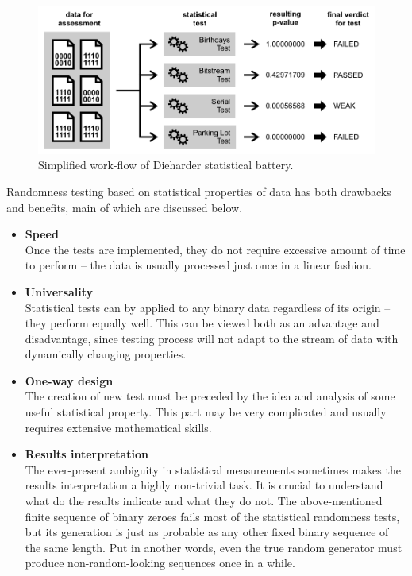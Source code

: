 \documentclass[12pt,twoside]{fithesis2}		%
\renewcommand{\_}{\leavevmode \kern0.0em\vbox{\hrule width0.4em}}
\newcommand{\squarebullet}{\textcolor{black}{\raisebox{0.15em}{\rule{4pt}{4pt}}}}
\newenvironment{myItemize}{
  \begin{itemize}[leftmargin=2em,rightmargin=1em,itemsep=\parskip ,parsep=0em,topsep=0em,partopsep=0em]
  \renewcommand{\labelitemi}{\squarebullet}
  \renewcommand{\labelitemii}{$\diamond$}
}{
  \end{itemize}
}
\begin{document}
\begin{figure}[b!]
\centering
\includegraphics[width=\textwidth]{images/workflow-statistical-batteries}
\caption{Simplified work-flow of Dieharder statistical battery.}
\label{fig:workflow-statistical-batteries}
\end{figure}

Randomness testing based on statistical properties of data has both drawbacks and benefits, main of which are discussed below.
\begin{myItemize}
\item \textbf{Speed}\\
Once the tests are implemented, they do not require excessive amount of time to perform -- 
the data is usually processed just once in a linear fashion.
\item \textbf{Universality}\\
Statistical tests can by applied to any binary data regardless of its origin -- they perform equally well. 
This can be viewed both as an advantage and disadvantage, since testing process will not adapt to the stream of
data with dynamically changing properties.
\item \textbf{One-way design}\\
The creation of new test must be preceded by the idea and analysis of some useful statistical property. This part may be 
very complicated and usually requires extensive mathematical skills.
\item \textbf{Results interpretation}\\
The ever-present ambiguity in statistical measurements sometimes makes the results interpretation a highly non-trivial task.
It is crucial to understand what do the results indicate and what they do not. The above-mentioned finite sequence of binary zeroes
fails most of the statistical randomness tests, but its generation is just as probable 
as any other fixed binary sequence of the same length.
Put in another words, even the true random generator must produce non-random-looking sequences once in a while.
\end{myItemize}
\end{document}
